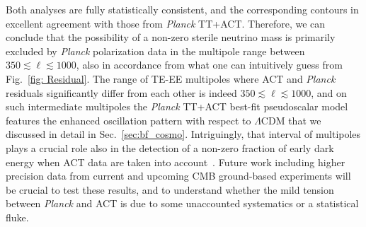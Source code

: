 \documentclass[a4paper,11pt]{article}
\begin{document}
Both analyses are fully {statistically} consistent, and the corresponding contours in excellent agreement with those from \emph{Planck} TT+ACT.
Therefore, we can conclude that the possibility of a non-zero sterile neutrino mass is primarily excluded by \emph{Planck} polarization data in the multipole range between $350\lesssim\ell\lesssim1000$, also in accordance from what one can intuitively guess from Fig.~\ref{fig: Residual}. The range of TE-EE multipoles where ACT and \emph{Planck} residuals significantly differ from each other is indeed $350\lesssim\ell\lesssim1000$, and on such intermediate multipoles the \emph{Planck} TT+ACT best-fit pseudoscalar model features the enhanced oscillation pattern with respect to $\Lambda$CDM that we discussed in detail in Sec.~\ref{sec:bf_cosmo}.
Intriguingly, that interval of multipoles plays a crucial role also in the detection of a non-zero fraction of early dark energy when ACT data are taken into account~\cite{Hill:2021yec,Poulin:2021bjr}.
Future work including higher precision data from current and upcoming CMB ground-based experiments will be crucial to test these results, and to understand whether the mild tension between \emph{Planck} and ACT is due to some unaccounted systematics or a statistical fluke.
\end{document}
